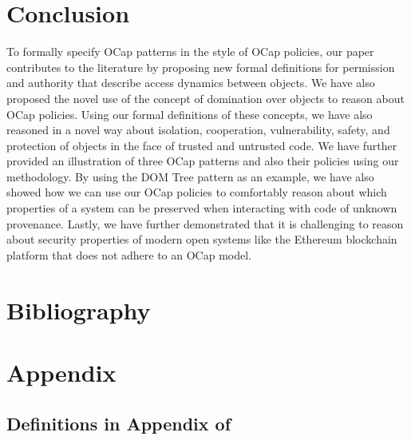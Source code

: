 \documentclass[a4paper,11pt,twoside]{article}
\begin{document}
{\section{Conclusion}
To formally specify OCap patterns in the style of OCap policies, our paper contributes to the literature by proposing new formal definitions for permission and authority that describe access dynamics between objects. We have also proposed the novel use of the concept of domination over objects to reason about OCap policies. Using our formal definitions of these concepts, we have also reasoned in a novel way about isolation, cooperation, vulnerability, safety, and protection of objects in the face of trusted and untrusted code. We have further provided an illustration of three OCap patterns and also their policies using our methodology. By using the DOM Tree pattern as an example, we have also showed how we can use our OCap policies to comfortably reason about which properties of a system can be preserved when interacting with code of unknown provenance. Lastly, we have further demonstrated that it is challenging to reason about security properties of modern open systems like the Ethereum blockchain platform that does not adhere to an OCap model.

\small
\section{Bibliography}


\clearpage
\section{Appendix}
\subsection{Definitions in Appendix of \cite{drossopoulou2015b}}
}
\end{document}
